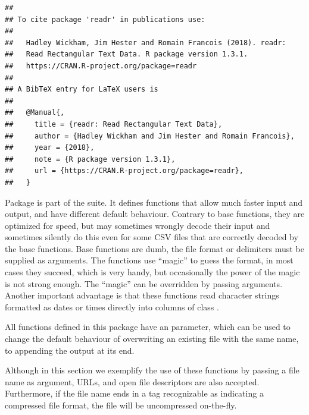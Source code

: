 \documentclass[krantz2]{krantz}\usepackage{knitr}%
\begin{document}
\begin{knitrout}\footnotesize
{}\color{fgcolor}\begin{kframe}
\begin{alltt}
\hlstd{(} \hlstd{=} \hlstd{)}
\end{alltt}
\begin{verbatim}
## 
## To cite package 'readr' in publications use:
## 
##   Hadley Wickham, Jim Hester and Romain Francois (2018). readr:
##   Read Rectangular Text Data. R package version 1.3.1.
##   https://CRAN.R-project.org/package=readr
## 
## A BibTeX entry for LaTeX users is
## 
##   @Manual{,
##     title = {readr: Read Rectangular Text Data},
##     author = {Hadley Wickham and Jim Hester and Romain Francois},
##     year = {2018},
##     note = {R package version 1.3.1},
##     url = {https://CRAN.R-project.org/package=readr},
##   }
\end{verbatim}
\end{kframe}
\end{knitrout}

Package  is part of the  suite. It defines functions that allow much faster input and output, and have different default behaviour. Contrary to base \Rlang functions, they are optimized for speed, but may sometimes wrongly decode their input and sometimes silently do this even for some CSV files that are correctly decoded by the base functions. Base \Rlang functions are dumb, the file format or delimiters must be supplied as arguments. The  functions use ``magic'' to guess the format, in most cases they succeed, which is very handy, but occasionally the power of the magic is not strong enough. The ``magic'' can be overridden by passing arguments. Another important advantage is that these functions read character strings formatted as dates or times directly into columns of class .

All  functions defined in this package have an  parameter, which can be used to change the default behaviour of overwriting an existing file with the same name, to appending the output at its end.

Although in this section we exemplify the use of these functions by passing a file name as argument, URLs, and open file descriptors are also accepted. Furthermore, if the file name ends in a tag recognizable as indicating a compressed file format, the file will be uncompressed on-the-fly.
\end{document}
